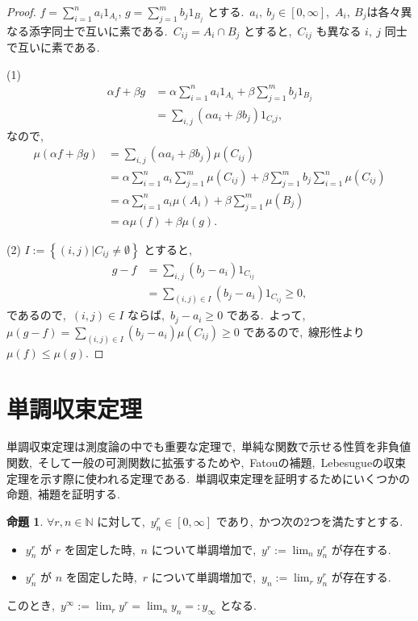 \documentclass[a4j,11pt]{jarticle}
\theoremstyle{definition}
\newtheorem{proposition}[theorem]{命題}
\begin{document}
\begin{proof}
  $f = \sum_{i=1}^n a_i 1_{A_i}$, 
  $g = \sum_{j=1}^m b_j 1_{B_j}$
  とする.\ 
  $a_i,\ b_j \in \left[ 0, \infty\right]$,\ 
  $A_i,\ B_j$は各々異なる添字同士で互いに素である.\ 
  $C_{ij} = A_i \cap B_j$
  とすると,\ 
  $C_{ij}$
  も異なる
  $i,\ j$
  同士で互いに素である.\ 

  (1)
  \begin{align}
    \alpha f + \beta g
    & = \alpha \sum_{i=1}^n a_i 1_{A_i} + \beta \sum_{j=1}^m b_j 1_{B_j} \\
    & = \sum_{i,j} \left( \alpha a_i + \beta b_j \right) 1_{C_ij},
  \end{align}
  なので,\ 
  \begin{align}
    \mu(\alpha f + \beta g)
    & = \sum_{i,j} \left( \alpha a_i + \beta b_j\right) \mu(C_{ij}) \\
    & = \alpha \sum_{i=1}^n a_i \sum_{j=1}^m \mu(C_{ij}) + \beta \sum_{j=1}^m b_j \sum_{i=1}^n \mu(C_{ij}) \\
    & = \alpha \sum_{i=1}^n a_i \mu(A_i) + \beta \sum_{j=1}^m \mu(B_j) \\
    & = \alpha \mu(f) + \beta \mu(g).
  \end{align}

  (2)
  $I := \left\{(i,j) | C_{ij} \neq \emptyset \right\}$
  とすると,\ 
  \begin{align}
    g- f
    & = \sum_{i,j} (b_j - a_i) 1_{C_{ij}} \\
    & = \sum_{(i,j) \in I} (b_j - a_i) 1_{C_{ij}} \geq 0,
  \end{align}
  であるので,\ 
  $(i,j) \in I$
  ならば,\ 
  $b_j - a_i \geq 0$
  である.\ 
  よって,\ 
  $\mu(g-f) = \sum_{(i,j) \in I} (b_j-a_i) \mu(C_{ij}) \geq 0$
  であるので,\ 線形性より
  $\mu(f) \leq \mu(g)$.
\end{proof}

\section*{単調収束定理}
単調収束定理は測度論の中でも重要な定理で,\ 単純な関数で示せる性質を非負値関数,\ そして一般の可測関数に拡張するためや,\ Fatouの補題,\ Lebesugueの収束定理を示す際に使われる定理である.\ 
単調収束定理を証明するためにいくつかの命題,\ 補題を証明する.\ 

\begin{proposition}\label{prop:doubly}
  $\forall r, n \in \mathbb{N}$
  に対して,\ 
  $y_n^r \in \left[ 0,\infty \right]$
  であり,\ かつ次の2つを満たすとする.\ 
  \begin{itemize}
    \item 
      $y_n^r$
      が
      $r$
      を固定した時,\ 
      $n$
      について単調増加で,\ 
      $y^r:=\lim_n y_n^r$
      が存在する.\ 
    \item
      $y_n^r$
      が
      $n$
      を固定した時,\ 
      $r$
      について単調増加で,\ 
      $y_n:=\lim_r y_n^r$
      が存在する.\ 
  \end{itemize}
  このとき,\ 
  $y^\infty:=\lim_r y^r = \lim_n y_n=:y_\infty$
  となる.\ 
\end{proposition}
\end{document}
